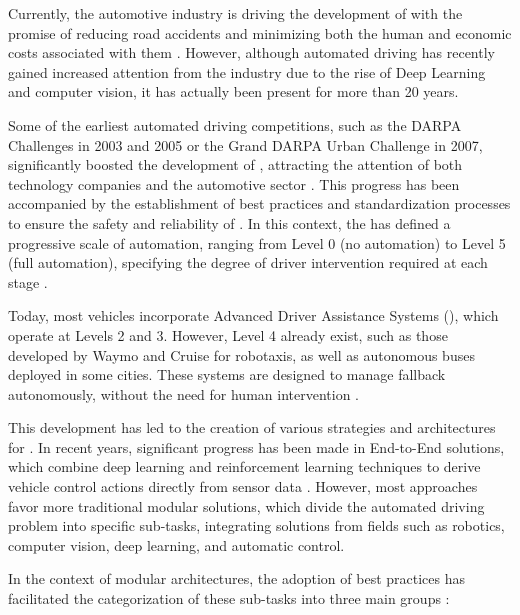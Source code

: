 
Currently, the automotive industry is driving the development of  with the promise of reducing road accidents and minimizing both the human and economic costs associated with them \cite{survey_AutomatedDriving1}. However, although automated driving has recently gained increased attention from the industry due to the rise of Deep Learning and computer vision, it has actually been present for more than 20 years.

Some of the earliest automated driving competitions, such as the DARPA Challenges in 2003 and 2005 or the Grand DARPA Urban Challenge in 2007, significantly boosted the development of , attracting the attention of both technology companies and the automotive sector \cite{survey_AutomatedDriving2}. This progress has been accompanied by the establishment of best practices and standardization processes to ensure the safety and reliability of . In this context, the  has defined a progressive scale of automation, ranging from Level 0 (no automation) to Level 5 (full automation), specifying the degree of driver intervention required at each stage \cite{AD_Technical_Standards}.

Today, most vehicles incorporate Advanced Driver Assistance Systems (), which operate at  Levels 2 and 3. However, Level 4  already exist, such as those developed by Waymo and Cruise for robotaxis, as well as autonomous buses deployed in some cities. These systems are designed to manage fallback autonomously, without the need for human intervention \cite{fallback_strategy}.

This development has led to the creation of various strategies and architectures for . In recent years, significant progress has been made in \mbox{End-to-End} solutions, which combine deep learning and reinforcement learning techniques to derive vehicle control actions directly from sensor data \cite{end_to_end_driving}. However, most approaches favor more traditional modular solutions, which divide the automated driving problem into specific \mbox{sub-tasks}, integrating solutions from fields such as robotics, computer vision, deep learning, and automatic control.

In the context of modular architectures, the adoption of best practices has facilitated the categorization of these \mbox{sub-tasks} into three main groups \cite{machines5010006}\cite{functional_architectures}:  

